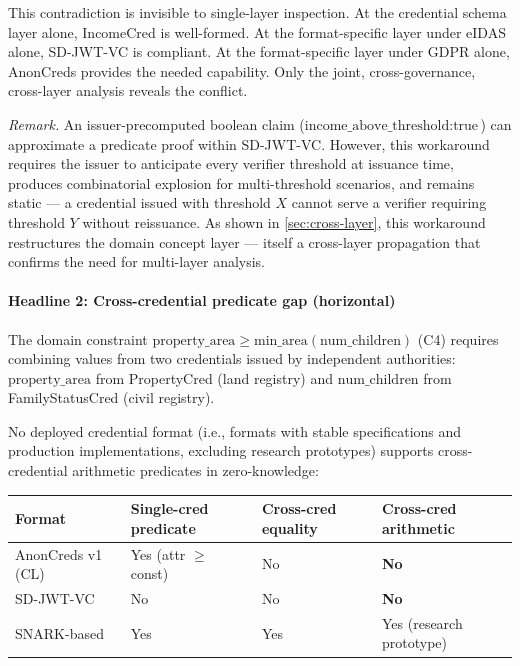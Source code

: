 This contradiction is invisible to single-layer inspection. At the credential schema layer alone, IncomeCred is well-formed. At the format-specific layer under eIDAS alone, SD-JWT-VC is compliant. At the format-specific layer under GDPR alone, AnonCreds provides the needed capability. Only the joint, cross-governance, cross-layer analysis reveals the conflict.


\emph{Remark.} An issuer-precomputed boolean claim (\(\text{income\_above\_threshold}: \text{true}\)) can approximate a predicate proof within SD-JWT-VC. However, this workaround requires the issuer to anticipate every verifier threshold at issuance time, produces combinatorial explosion for multi-threshold scenarios, and remains static --- a credential issued with threshold \(X\) cannot serve a verifier requiring threshold \(Y\) without reissuance. As shown in \autoref{sec:cross-layer}, this workaround restructures the domain concept layer --- itself a cross-layer propagation that confirms the need for multi-layer analysis.

\paragraph{Headline 2: Cross-credential predicate gap (horizontal)}\label{headline-2-cross-credential-predicate-gap-horizontal}

The domain constraint \(\text{property\_area} \geq \text{min\_area}(\text{num\_children})\) (C4) requires combining values from two credentials issued by independent authorities: \(\text{property\_area}\) from PropertyCred (land registry) and \(\text{num\_children}\) from FamilyStatusCred (civil registry).

No deployed credential format (i.e., formats with stable specifications and production implementations, excluding research prototypes) supports cross-credential arithmetic predicates in zero-knowledge:

\begin{center}
\begin{tabular}{llll}
\toprule
Format & Single-cred predicate & Cross-cred equality & Cross-cred arithmetic \\
\midrule
AnonCreds v1 (CL) & Yes (attr \(\geq\) const) & No & \textbf{No} \\
SD-JWT-VC & No & No & \textbf{No} \\
SNARK-based \citep{rosenberg_zk-creds_2023} & Yes & Yes & Yes (research prototype) \\
\bottomrule
\end{tabular}
\end{center}

